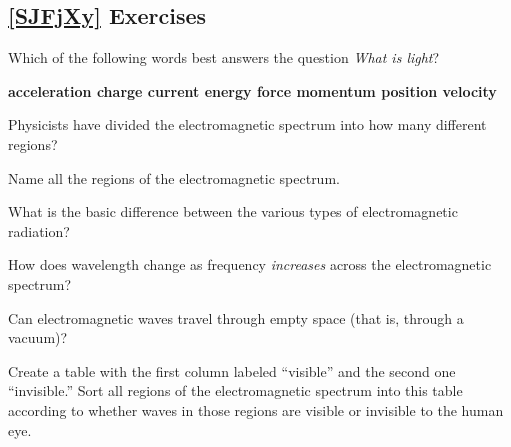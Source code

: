 \documentclass{article}
\numberwithin{equation}{section}
\numberwithin{figure}{section}
\begin{document}
\clearpage

\subsection*{\ref{SJFjXy} Exercises}

\begin{exercise}
    Which of the following words best answers the question \textit{What is light}?

\begin{mdframed}[backgroundcolor=black!10]
    \begin{center}
        \textbf{
        acceleration \hfill
        charge \hfill
        current \hfill
        energy \hfill
        force \hfill
        momentum \hfill
        position \hfill
        velocity \hfill
        }
    \end{center}
\end{mdframed}
\end{exercise}

\begin{exercise}
    Physicists have divided the electromagnetic spectrum into how many different regions?
\end{exercise}

\begin{exercise}
    Name all the regions of the electromagnetic spectrum.
\end{exercise}

\begin{exercise}
    What is the basic difference between the various types of electromagnetic radiation?
\end{exercise}

\begin{exercise}
    How does wavelength change as frequency \textit{increases} across the electromagnetic spectrum?
\end{exercise}

\begin{exercise}
    Can electromagnetic waves travel through empty space (that is, through a vacuum)?
\end{exercise}

\begin{exercise}
    Create a table with the first column labeled ``visible'' and the second one ``invisible.'' Sort all regions of the electromagnetic spectrum into this table according to whether waves in those regions are visible or invisible to the human eye.
\end{exercise}
\end{document}

